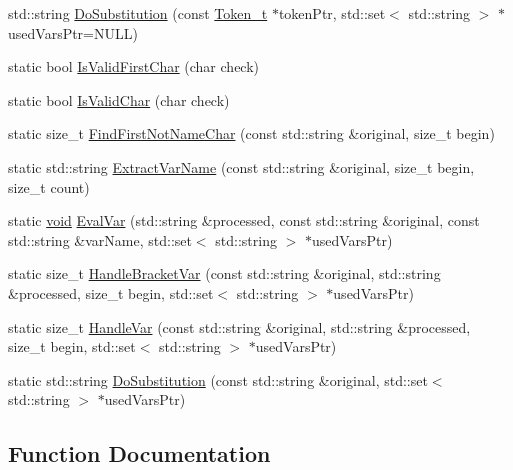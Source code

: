 \begin{DoxyCompactItemize}
\item 
std\+::string \hyperlink{namespaceparse_tree_a5cd61007054e0ad9019197c9aaad47a8}{Do\+Substitution} (const \hyperlink{structparse_tree_1_1_token__t}{Token\+\_\+t} $\ast$token\+Ptr, std\+::set$<$ std\+::string $>$ $\ast$used\+Vars\+Ptr=N\+U\+LL)
\item 
static bool \hyperlink{namespaceparse_tree_a7ebf69255296060028bb97815b9d6e14}{Is\+Valid\+First\+Char} (char check)
\item 
static bool \hyperlink{namespaceparse_tree_aa7b75069f3e5c90c816402a071c502ef}{Is\+Valid\+Char} (char check)
\item 
static size\+\_\+t \hyperlink{namespaceparse_tree_afb1767f79f562f030f87d31de2d7c243}{Find\+First\+Not\+Name\+Char} (const std\+::string \&original, size\+\_\+t begin)
\item 
static std\+::string \hyperlink{namespaceparse_tree_aab1c28a72e7c4ed2fe319da6abb6c048}{Extract\+Var\+Name} (const std\+::string \&original, size\+\_\+t begin, size\+\_\+t count)
\item 
static \hyperlink{_t_e_m_p_l_a_t_e__cdef_8h_ac9c84fa68bbad002983e35ce3663c686}{void} \hyperlink{namespaceparse_tree_a51f6ab1ef8e594d9c4b7604a6bacba01}{Eval\+Var} (std\+::string \&processed, const std\+::string \&original, const std\+::string \&var\+Name, std\+::set$<$ std\+::string $>$ $\ast$used\+Vars\+Ptr)
\item 
static size\+\_\+t \hyperlink{namespaceparse_tree_a6c9863715769b02d607b23e1542fa70e}{Handle\+Bracket\+Var} (const std\+::string \&original, std\+::string \&processed, size\+\_\+t begin, std\+::set$<$ std\+::string $>$ $\ast$used\+Vars\+Ptr)
\item 
static size\+\_\+t \hyperlink{namespaceparse_tree_a344bccc0ae017fa3e804a6dc454c0db2}{Handle\+Var} (const std\+::string \&original, std\+::string \&processed, size\+\_\+t begin, std\+::set$<$ std\+::string $>$ $\ast$used\+Vars\+Ptr)
\item 
static std\+::string \hyperlink{namespaceparse_tree_a33fa4585478bf3976a0aa24c251eb70e}{Do\+Substitution} (const std\+::string \&original, std\+::set$<$ std\+::string $>$ $\ast$used\+Vars\+Ptr)
\end{DoxyCompactItemize}


\subsection{Function Documentation}
